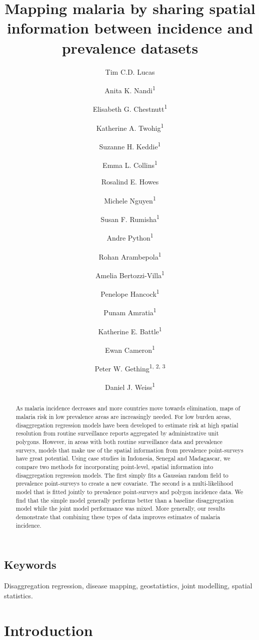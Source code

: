 \documentclass{statsoc}
\title[Mapping malaria by sharing spatial information]{Mapping malaria by sharing spatial information between incidence and prevalence datasets}
\author[Tim C.D. Lucas {\it et al.}]{Tim C.D. Lucas}
\author{Anita K. Nandi\textsuperscript{1}}
\author{Elisabeth G. Chestnutt\textsuperscript{1}}
\author{Katherine A. Twohig\textsuperscript{1}}
\author{Suzanne H. Keddie\textsuperscript{1}}
\author{Emma L. Collins\textsuperscript{1}}
\author{Rosalind E. Howes}
\author{Michele Nguyen\textsuperscript{1}}
\author{Susan F. Rumisha\textsuperscript{1}}
\author{Andre Python\textsuperscript{1}}
\author{Rohan Arambepola\textsuperscript{1}}
\author{Amelia Bertozzi-Villa\textsuperscript{1}}
\author{Penelope Hancock\textsuperscript{1}}
\author{Punam Amratia\textsuperscript{1}}
\author{Katherine E. Battle\textsuperscript{1}}
\author{Ewan Cameron\textsuperscript{1}}
\author{Peter W. Gething\textsuperscript{1, 2, 3}}
\author{Daniel J. Weiss\textsuperscript{1}}
\begin{document}
\begin{abstract}
As malaria incidence decreases and more countries move towards elimination, maps of malaria risk in low prevalence areas are increasingly needed.
For low burden areas, disaggregation regression models have been developed to estimate risk at high spatial resolution from routine surveillance reports aggregated by administrative unit polygons.
However, in areas with both routine surveillance data and prevalence surveys, models that make use of the spatial information from prevalence point-surveys have great potential.
Using case studies in Indonesia, Senegal and Madagascar, we compare two methods for incorporating point-level, spatial information into disaggregation regression models.
The first simply fits a Gaussian random field to prevalence point-surveys to create a new covariate.
The second is a multi-likelihood model that is fitted jointly to prevalence point-surveys and polygon incidence data.
We find that the simple model generally performs better than a baseline disaggregation model while the joint model performance was mixed.
More generally, our results demonstrate that combining these types of data improves estimates of malaria incidence.
\end{abstract}

\subsection{Keywords}
Disaggregation regression, disease mapping, geostatistics, joint modelling, spatial statistics.


\section*{Introduction}


\end{document}
